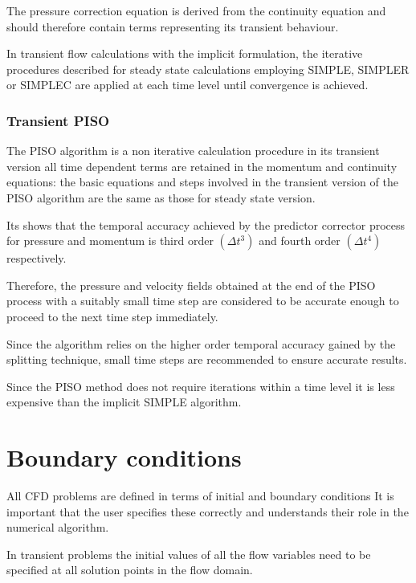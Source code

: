 \documentclass[a4paper, 15pt]{article}
\begin{document}
The
pressure correction equation is derived from the continuity equation and should therefore
contain terms representing its transient behaviour. \newline 

In
transient flow calculations with the implicit formulation, the iterative procedures described for
steady state calculations employing SIMPLE, SIMPLER or SIMPLEC are applied at each time level
until convergence is achieved. 

\section{Transient PISO}

The
PISO algorithm is a non iterative calculation procedure in its transient version all time
dependent terms are retained in the momentum and continuity equations: the basic equations and steps involved in the transient version of the PISO algorithm
are the same as those for steady state version. \newline 

Its shows that the temporal accuracy achieved by the predictor corrector process for
pressure and momentum is third order $(\Delta t^3)$ and fourth order $(\Delta t^4)$ respectively. \newline 

Therefore,
the pressure and velocity fields obtained at the end of the PISO process with a
suitably small time step are considered to be accurate enough to proceed to the next time step immediately.

Since
the algorithm relies on the higher order temporal accuracy gained by the splitting
technique, small time steps are recommended to ensure accurate results. \newline

Since
the PISO method does not require iterations within a time level it is less expensive than the
implicit SIMPLE algorithm. 


\part{Boundary conditions}
All
CFD problems are defined in terms of initial and boundary conditions It is important that the user
specifies these correctly and understands their role in the numerical algorithm. 

In
transient problems the initial values of all the flow variables need to be specified at all solution points
in the flow domain. \newline 
\end{document}
